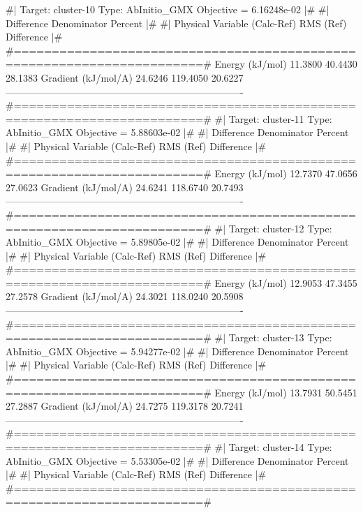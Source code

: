\begin{DoxyVerb}
#|  Target: cluster-10 Type: AbInitio_GMX Objective = 6.16248e-02      |#
#|                              Difference   Denominator     Percent   |#
#|  Physical Variable           (Calc-Ref)     RMS (Ref)   Difference  |#
#=======================================================================#
    Energy (kJ/mol)                11.3800       40.4430     28.1383%
    Gradient (kJ/mol/A)            24.6246      119.4050     20.6227%
-------------------------------------------------------------------------
#=======================================================================#
#|  Target: cluster-11 Type: AbInitio_GMX Objective = 5.88603e-02      |#
#|                              Difference   Denominator     Percent   |#
#|  Physical Variable           (Calc-Ref)     RMS (Ref)   Difference  |#
#=======================================================================#
    Energy (kJ/mol)                12.7370       47.0656     27.0623%
    Gradient (kJ/mol/A)            24.6241      118.6740     20.7493%
-------------------------------------------------------------------------
#=======================================================================#
#|  Target: cluster-12 Type: AbInitio_GMX Objective = 5.89805e-02      |#
#|                              Difference   Denominator     Percent   |#
#|  Physical Variable           (Calc-Ref)     RMS (Ref)   Difference  |#
#=======================================================================#
    Energy (kJ/mol)                12.9053       47.3455     27.2578%
    Gradient (kJ/mol/A)            24.3021      118.0240     20.5908%
-------------------------------------------------------------------------
#=======================================================================#
#|  Target: cluster-13 Type: AbInitio_GMX Objective = 5.94277e-02      |#
#|                              Difference   Denominator     Percent   |#
#|  Physical Variable           (Calc-Ref)     RMS (Ref)   Difference  |#
#=======================================================================#
    Energy (kJ/mol)                13.7931       50.5451     27.2887%
    Gradient (kJ/mol/A)            24.7275      119.3178     20.7241%
-------------------------------------------------------------------------
#=======================================================================#
#|  Target: cluster-14 Type: AbInitio_GMX Objective = 5.53305e-02      |#
#|                              Difference   Denominator     Percent   |#
#|  Physical Variable           (Calc-Ref)     RMS (Ref)   Difference  |#
#=======================================================================#

\end{DoxyVerb}
